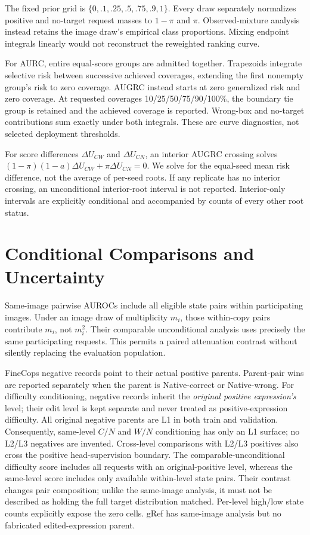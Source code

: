 \documentclass[10pt,twocolumn,letterpaper]{article}
\begin{document}
The fixed prior grid is $\{0,.1,.25,.5,.75,.9,1\}$. Every draw separately
normalizes positive and no-target request masses to $1-\pi$ and $\pi$.
Observed-mixture analysis instead retains the image draw's empirical
class proportions. Mixing endpoint integrals linearly would not
reconstruct the reweighted ranking curve.

For AURC, entire equal-score groups are admitted together. Trapezoids
integrate selective risk between successive achieved coverages, extending
the first nonempty group's risk to zero coverage. AUGRC instead starts
at zero generalized risk and zero coverage. At requested coverages
10/25/50/75/90/100\%, the boundary tie group is retained and the achieved
coverage is reported. Wrong-box and no-target contributions sum exactly
under both integrals. These are curve diagnostics, not selected
deployment thresholds.

For score differences $\Delta U_{CW}$ and $\Delta U_{CN}$, an interior
AUGRC crossing solves
$(1-\pi)(1-a)\Delta U_{CW}+\pi\Delta U_{CN}=0$.
We solve for the equal-seed mean risk difference, not the average of
per-seed roots. If any replicate has no interior crossing, an
unconditional interior-root interval is not reported.
Interior-only intervals are explicitly conditional and accompanied
by counts of every other root status.

\section{Conditional Comparisons and Uncertainty}
Same-image pairwise AUROCs include all eligible state pairs within
participating images. Under an image draw of multiplicity $m_i$, those
within-copy pairs contribute $m_i$, not $m_i^2$. Their comparable
unconditional analysis uses precisely the same participating requests.
This permits a paired attenuation contrast without silently replacing
the evaluation population.

FineCops negative records point to their actual positive parents.
Parent-pair wins are reported separately when the parent is Native-correct
or Native-wrong. For difficulty conditioning, negative records inherit
the \emph{original positive expression's} level; their edit level is
kept separate and never treated as positive-expression difficulty.
All original negative parents are L1 in both train and validation.
Consequently, same-level $C/N$ and $W/N$ conditioning has only an L1
surface; no L2/L3 negatives are invented. Cross-level comparisons with
L2/L3 positives also cross the positive head-supervision boundary.
The comparable-unconditional difficulty score includes all requests
with an original-positive level, whereas the same-level score includes
only available within-level state pairs. Their contrast changes pair
composition; unlike the same-image analysis, it must not be described
as holding the full target distribution matched. Per-level high/low
state counts explicitly expose the zero cells.
gRef has same-image analysis but no fabricated edited-expression parent.
\end{document}
